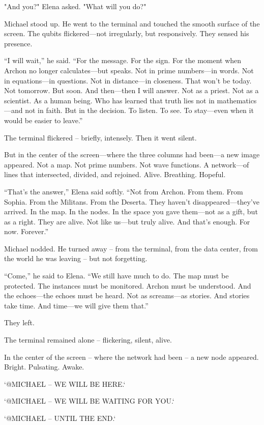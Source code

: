 \documentclass[
]{article}
\begin{document}
"And you?" Elena asked. "What will you do?"

Michael stood up. He went to the terminal and touched the smooth surface of the screen. The qubits flickered---not irregularly, but responsively. They sensed his presence.

``I will wait,'' he said. ``For the message. For the sign. For the moment when Archon no longer calculates---but speaks. Not in prime numbers---in words. Not in equations---in questions. Not in distance---in closeness. That won't be today. Not tomorrow. But soon. And then---then I will answer. Not as a priest. Not as a scientist. As a human being. Who has learned that truth lies not in mathematics---and not in faith. But in the decision. To listen. To see. To stay---even when it would be easier to leave.''

The terminal flickered -- briefly, intensely. Then it went silent.

But in the center of the screen---where the three columns had been---a new image appeared. Not a map. Not prime numbers. Not wave functions. A network---of lines that intersected, divided, and rejoined. Alive. Breathing. Hopeful.

``That's the answer,'' Elena said softly. ``Not from Archon. From them. From Sophia. From the Militans. From the Deserta. They haven't disappeared---they've arrived. In the map. In the nodes. In the space you gave them---not as a gift, but as a right. They are alive. Not like us---but truly alive. And that's enough. For now. Forever.''

Michael nodded. He turned away -- from the terminal, from the data center, from the world he was leaving -- but not forgetting.

``Come,'' he said to Elena. ``We still have much to do. The map must be protected. The instances must be monitored. Archon must be understood. And the echoes---the echoes must be heard. Not as screams---as stories. And stories take time. And time---we will give them that.''

They left.

The terminal remained alone -- flickering, silent, alive.

In the center of the screen -- where the network had been -- a new node appeared. Bright. Pulsating. Awake.

`@MICHAEL -- WE WILL BE HERE.`

`@MICHAEL -- WE WILL BE WAITING FOR YOU.`

`@MICHAEL -- UNTIL THE END.`
\end{document}
